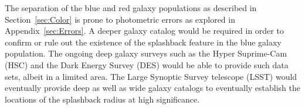 \documentclass[iop, apjl, twocolappendix, numberedappendix]{emulateapj}
\begin{document}


The separation of the blue and red galaxy populations as described in
Section~\ref{sec:Color} is prone to photometric errors as explored in
 Appendix~\ref{sec:Errors}. A deeper galaxy catalog would be required in order to
confirm or rule out the existence of the splashback feature in the
blue galaxy population. The ongoing deep galaxy surveys such as the
Hyper Suprime-Cam (HSC) and the Dark Energy Survey (DES) would be able
to provide such data sets, albeit in a limited area. The Large
Synoptic Survey telescope (LSST) would eventually provide deep as well
as wide galaxy catalogs to eventually establish the locations of the
splashback radius at high significance.
\end{document}
